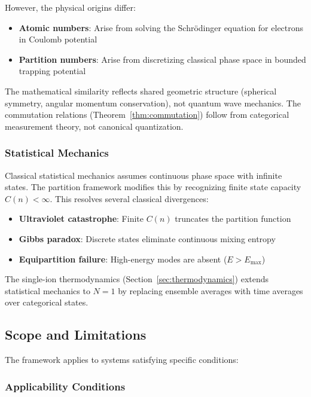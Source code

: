 However, the physical origins differ:
\begin{itemize}
    \item \textbf{Atomic numbers}: Arise from solving the Schrödinger equation for electrons in Coulomb potential
    \item \textbf{Partition numbers}: Arise from discretizing classical phase space in bounded trapping potential
\end{itemize}

The mathematical similarity reflects shared geometric structure (spherical symmetry, angular momentum conservation), not quantum wave mechanics. The commutation relations (Theorem~\ref{thm:commutation}) follow from categorical measurement theory, not canonical quantization.

\subsubsection{Statistical Mechanics}

Classical statistical mechanics assumes continuous phase space with infinite states. The partition framework modifies this by recognizing finite state capacity $C(n) < \infty$. This resolves several classical divergences:

\begin{itemize}
    \item \textbf{Ultraviolet catastrophe}: Finite $C(n)$ truncates the partition function
    \item \textbf{Gibbs paradox}: Discrete states eliminate continuous mixing entropy
    \item \textbf{Equipartition failure}: High-energy modes are absent ($E > E_{\max}$)
\end{itemize}

The single-ion thermodynamics (Section~\ref{sec:thermodynamics}) extends statistical mechanics to $N=1$ by replacing ensemble averages with time averages over categorical states.

\subsection{Scope and Limitations}

The framework applies to systems satisfying specific conditions:

\subsubsection{Applicability Conditions}

